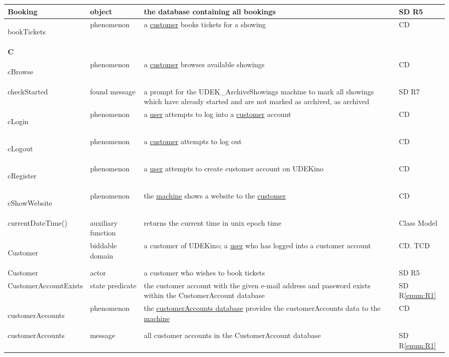 \documentclass[a4paper,10pt,titlepage,bibtotoc,bibtotocnumbered]{scrreprt}
\begin{document}
\begin{longtable}{|p{4.75cm}|p{3cm}|p{5cm}|l|}
\hline
Booking & object & the database containing all bookings & SD R5\\
\hline
\hypertarget{glossary:bookTickets}{bookTickets} & phenomenon & a \hyperlink{glossary:Customer}{customer} books tickets for a showing & CD\\
\hline
\multicolumn{4}{|l|}{\textbf{C}}\\
\hline
\hypertarget{glossary:cBrowse}{cBrowse} & phenomenon & a \hyperlink{glossary:Customer}{customer} browses available showings & CD\\
\hline
checkStarted & found message & a prompt for the UDEK\_ArchiveShowings machine to mark all showings which have already started and are not marked as archived, as archived & SD R7\\
\hline
\hypertarget{glossary:cLogin}{cLogin} & phenomenon & a \hyperlink{glossary:User}{user} attempts to log into a \hyperlink{glossary:Customer}{customer} account & CD\\
\hline
\hypertarget{glossary:cLogout}{cLogout} & phenomenon & a \hyperlink{glossary:Customer}{customer} attempts to log out & CD\\
\hline
\hypertarget{glossary:cRegister}{cRegister} & phenomenon & a \hyperlink{glossary:User}{user} attempts to create customer account on UDEKino & CD\\
\hline
\hypertarget{glossary:cShowWebsite}{cShowWebsite} & phenomenon & the \hyperlink{glossary:UDEKino}{machine} shows a website to the \hyperlink{glossary:Customer}{customer} & CD\\
\hline
currentDateTime() & auxiliary function & returns the current time in unix epoch time & Class Model\\
\hline
\hypertarget{glossary:Customer}{Customer} & biddable domain & a customer of UDEKino; a \hyperlink{glossary:User}{user} who has logged into a customer account & CD. TCD\\
\hline
Customer & actor & a customer who wishes to book tickets & SD R5\\
\hline
CustomerAccountExists & state predicate & the customer account with the given e-mail address and password exists within the CustomerAccount database & SD R\ref{enum:R1}\\
\hline
\hypertarget{glossary:customerAccounts}{customerAccounts} & phenomenon & the \hyperlink{glossary:CustomerAccount}{customerAccounts database} provides the customerAccounts data to the \hyperlink{glossary:UDEKino}{machine} & CD\\
\hline
customerAccounts & message & all customer accounts in the CustomerAccount database & SD R\ref{enum:R1}\\

\end{longtable}
\end{document}
